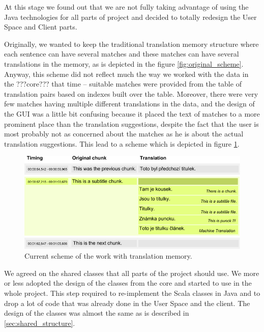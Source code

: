 At this stage we found out that we are not fully taking advantage of using the Java technologies for all parts of project and decided to totally redesign the User Space and Client parts.

Originally, we wanted to keep the traditional translation memory structure where each sentence can have several matches and these matches can have several translations in the memory, as is depicted in the figure \ref{fig:original_scheme}. Anyway, this scheme did not reflect much the way we worked with the data in the ???core??? that time -- suitable matches were provided from the table of translation pairs based on indexes built over the table. Moreover, there were very few matches having multiple different translations in the data, and the design of the GUI was a little bit confusing because it placed the text of matches to a more prominent place than the translation suggestions, despite the fact that the user is most probably not as concerned about the matches as he is about the actual translation suggestions. This lead to a scheme which is depicted in figure \ref{fig:new_scheme}.

\begin{figure}
\begin{center}
\includegraphics{./figures/current_strucutre.pdf}
\end{center}
\caption{Current scheme of the work with translation memory.}\label{fig:new_scheme}
\end{figure}

We agreed on the shared classes that all parts of the project should use. We more or less adopted the design of the classes from the core and started to use in the whole project. This step required to re-implement the Scala classes in Java and to drop a lot of code that was already done in the User Space and the client. The design of the classes was almost the same as is described in \ref{sec:shared_structure}. 

